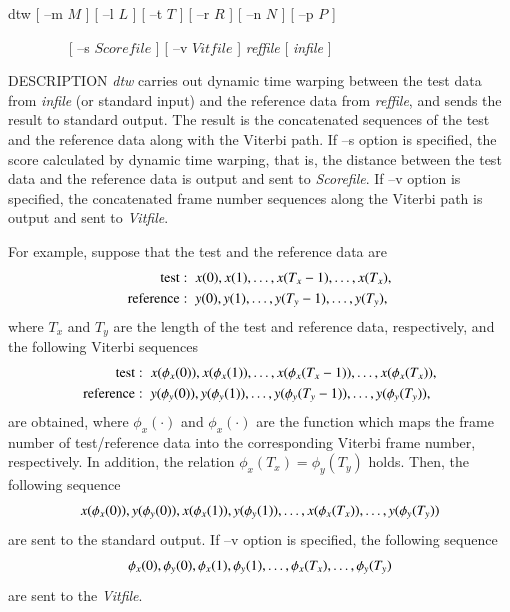 \hypertarget{dtw}{}
\begin{synopsis}
\item[dtw] [ --m $M$ ]  [ --l $L$ ]  [ --t $T$ ]  [ --r $R$ ]
           [ --n $N$ ]  [ --p $P$ ]
 \item [\ ~~~~~~~] [ --s $Scorefile$ ]  [ --v $Vitfile$ ]
 {\em reffile} [ {\em infile} ]
\end{synopsis}

\begin{qsection}{DESCRIPTION}
 {\em dtw} carries out dynamic time warping between
 the test data from {\em infile} (or standard input)
 and the reference data from {\em reffile},
 and sends the result to standard output.
 The result is the concatenated sequences
 of the test and the reference data
 along with the Viterbi path.
 If --s option is specified,
 the score calculated by dynamic time warping,
 that is, the distance between the test data and the reference data
 is output and sent to {\em Scorefile}.
 If --v option is specified,
 the concatenated frame number sequences
 along the Viterbi path
 is output and sent to {\em Vitfile}.

 For example, suppose that the test and the reference data are
 \begin{align}
  \mathrm{test} :\;\; & x(0), x(1), \dots, x(T_x - 1), \dots, x(T_x), \notag \\
  \mathrm{reference}  :\;\; & y(0), y(1), \dots, y(T_y - 1), \dots, y(T_y), \notag
 \end{align}
 where $T_x$ and $T_y$ are the length of the test and reference data,
 respectively,
 and the following Viterbi sequences
 \begin{align}
  \mathrm{test} :\;\; & x(\phi_x(0)), x(\phi_x(1)), \dots, x(\phi_x(T_x - 1)),
  \dots, x(\phi_{x}(T_x)), \notag \\
  \mathrm{reference}  :\;\; & y(\phi_y(0)), y(\phi_y(1)), \dots,
  y(\phi_y(T_y - 1)), \dots, y(\phi_y(T_y)), \notag
 \end{align}
 are obtained, where $\phi_x(\cdot)$ and $\phi_x(\cdot)$ are the function which
 maps the frame number of test/reference data
 into the corresponding Viterbi frame number, respectively.
 In addition, the relation $\phi_x(T_x)=\phi_y(T_y)$ holds.
 Then, the following sequence
 \begin{align}
  x(\phi_x(0)), y(\phi_y(0)),
  x(\phi_x(1)), y(\phi_y(1)),
  \dots, x(\phi_{x}(T_x)), \dots, y(\phi_y(T_y)) \notag
 \end{align}
 are sent to the standard output.
 If --v option is specified, the following sequence
 \begin{align}
  \phi_x(0), \phi_y(0),
  \phi_x(1), \phi_y(1),
  \dots, \phi_{x}(T_x), \dots, \phi_y(T_y) \notag
 \end{align}
 are sent to the {\em Vitfile}.


\end{qsection}
